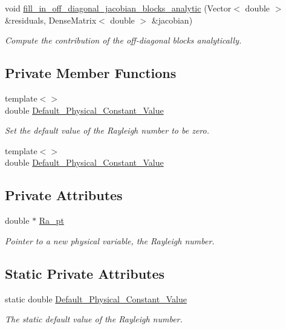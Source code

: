 \begin{DoxyCompactItemize}
\item 
void \hyperlink{classoomph_1_1RefineableBuoyantQCrouzeixRaviartElement_a6fe93946149c696f273be12540099d1a}{fill\+\_\+in\+\_\+off\+\_\+diagonal\+\_\+jacobian\+\_\+blocks\+\_\+analytic} (Vector$<$ double $>$ \&residuals, Dense\+Matrix$<$ double $>$ \&jacobian)
\begin{DoxyCompactList}\small\item\em Compute the contribution of the off-\/diagonal blocks analytically. \end{DoxyCompactList}\end{DoxyCompactItemize}
\subsection*{Private Member Functions}
\begin{DoxyCompactItemize}
\item 
{\footnotesize template$<$$>$ }\\double \hyperlink{classoomph_1_1RefineableBuoyantQCrouzeixRaviartElement_ab36052eddfa043777414ce64470bb0a3}{Default\+\_\+\+Physical\+\_\+\+Constant\+\_\+\+Value}
\begin{DoxyCompactList}\small\item\em Set the default value of the Rayleigh number to be zero. \end{DoxyCompactList}\item 
{\footnotesize template$<$$>$ }\\double \hyperlink{classoomph_1_1RefineableBuoyantQCrouzeixRaviartElement_a4e22ae2489586ac69c1e5ebcb04e6343}{Default\+\_\+\+Physical\+\_\+\+Constant\+\_\+\+Value}
\end{DoxyCompactItemize}
\subsection*{Private Attributes}
\begin{DoxyCompactItemize}
\item 
double $\ast$ \hyperlink{classoomph_1_1RefineableBuoyantQCrouzeixRaviartElement_a65ce0c55087be240fc183e08def8b07b}{Ra\+\_\+pt}
\begin{DoxyCompactList}\small\item\em Pointer to a new physical variable, the Rayleigh number. \end{DoxyCompactList}\end{DoxyCompactItemize}
\subsection*{Static Private Attributes}
\begin{DoxyCompactItemize}
\item 
static double \hyperlink{classoomph_1_1RefineableBuoyantQCrouzeixRaviartElement_a33bf1cb8ad42fc6418e71acabbe1925e}{Default\+\_\+\+Physical\+\_\+\+Constant\+\_\+\+Value}
\begin{DoxyCompactList}\small\item\em The static default value of the Rayleigh number. \end{DoxyCompactList}\end{DoxyCompactItemize}


